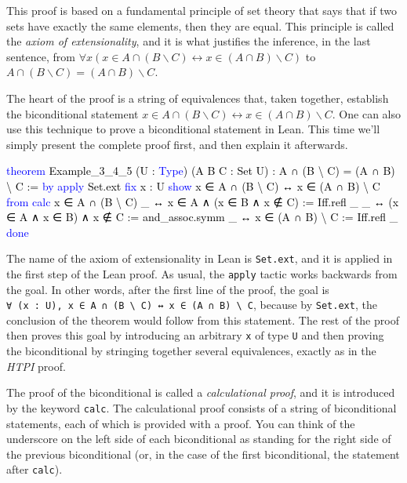 \documentclass[
  letterpaper,
  DIV=11,
  numbers=noendperiod]{scrreprt}
\newenvironment{Shaded}{\begin{snugshade}}{\end{snugshade}}
\newcommand{\KeywordTok}[1]{\textcolor[rgb]{0.00,0.23,0.31}{#1}}
\newcommand{\NormalTok}[1]{\textcolor[rgb]{0.00,0.23,0.31}{#1}}
\renewcommand{\NormalTok}[1]{\textcolor[HTML]{000000}{#1}}
\renewcommand{\KeywordTok}[1]{\textcolor[HTML]{0000FF}{#1}}
\newcommand{\setmin}{\mathbin{\backslash}}
\theoremstyle{remark}
\begin{document}
This proof is based on a fundamental principle of set theory that says
that if two sets have exactly the same elements, then they are equal.
This principle is called the \emph{axiom of extensionality}, and it is
what justifies the inference, in the last sentence, from
\(\forall x(x \in A \cap (B \setmin C) \leftrightarrow x \in (A \cap B) \setmin C)\)
to \(A \cap (B \setmin C) = (A \cap B) \setmin C\).

The heart of the proof is a string of equivalences that, taken together,
establish the biconditional statement
\(x \in A \cap (B \setmin C) \leftrightarrow x \in (A \cap B) \setmin C\).
One can also use this technique to prove a biconditional statement in
Lean. This time we'll simply present the complete proof first, and then
explain it afterwards.

\begin{Shaded}
\begin{Highlighting}[]
\KeywordTok{theorem}\NormalTok{ Example\_3\_4\_5 (U : }\KeywordTok{Type}\NormalTok{)}
\NormalTok{    (A B C : Set U) : A ∩ (B \textbackslash{} C) = (A ∩ B) \textbackslash{} C := }\KeywordTok{by}
  \KeywordTok{apply}\NormalTok{ Set.ext}
  \KeywordTok{fix}\NormalTok{ x : U}
  \KeywordTok{show}\NormalTok{ x ∈ A ∩ (B \textbackslash{} C) ↔ x ∈ (A ∩ B) \textbackslash{} C }\KeywordTok{from}
    \KeywordTok{calc}\NormalTok{ x ∈ A ∩ (B \textbackslash{} C)}
\NormalTok{      \_ ↔ x ∈ A ∧ (x ∈ B ∧ x ∉ C) := Iff.refl \_}
\NormalTok{      \_ ↔ (x ∈ A ∧ x ∈ B) ∧ x ∉ C := and\_assoc.symm}
\NormalTok{      \_ ↔ x ∈ (A ∩ B) \textbackslash{} C := Iff.refl \_}
  \KeywordTok{done}
\end{Highlighting}
\end{Shaded}

The name of the axiom of extensionality in Lean is \texttt{Set.ext}, and
it is applied in the first step of the Lean proof. As usual, the
\texttt{apply} tactic works backwards from the goal. In other words,
after the first line of the proof, the goal is
\texttt{∀\ (x\ :\ U),\ x\ ∈\ A\ ∩\ (B\ \textbackslash{}\ C)\ ↔\ x\ ∈\ (A\ ∩\ B)\ \textbackslash{}\ C},
because by \texttt{Set.ext}, the conclusion of the theorem would follow
from this statement. The rest of the proof then proves this goal by
introducing an arbitrary \texttt{x} of type \texttt{U} and then proving
the biconditional by stringing together several equivalences, exactly as
in the \emph{HTPI} proof.

The proof of the biconditional is called a \emph{calculational proof},
and it is introduced by the keyword \texttt{calc}. The calculational
proof consists of a string of biconditional statements, each of which is
provided with a proof. You can think of the underscore on the left side
of each biconditional as standing for the right side of the previous
biconditional (or, in the case of the first biconditional, the statement
after \texttt{calc}).
\end{document}
